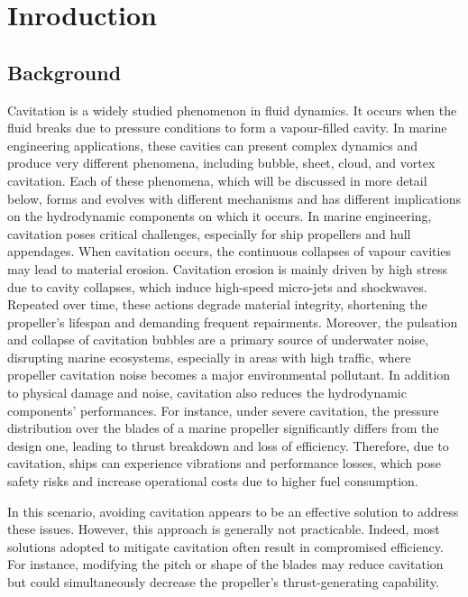 \chapter{Inroduction}
\label{chap:chapter1}

\section{Background}

Cavitation is a widely studied phenomenon in fluid dynamics. It occurs when the fluid breaks due to pressure conditions to form a vapour-filled cavity. In marine engineering applications, these cavities can present complex dynamics and produce very different phenomena, including bubble, sheet, cloud, and vortex cavitation. 
Each of these phenomena, which will be discussed in more detail below, forms and evolves with different mechanisms and has different implications on the hydrodynamic components on which it occurs.
In marine engineering, cavitation poses critical challenges, especially for ship propellers and hull appendages. When cavitation occurs, the continuous collapses of vapour cavities may lead to material erosion.
Cavitation erosion is mainly driven by high stress due to cavity collapses, which induce high-speed micro-jets and shockwaves. Repeated over time, these actions degrade material integrity, shortening the propeller's lifespan and demanding frequent repairments.
Moreover, the pulsation and collapse of cavitation bubbles are a primary source of underwater noise, disrupting marine ecosystems, especially in areas with high traffic, where propeller cavitation noise becomes a major environmental pollutant.
In addition to physical damage and noise, cavitation also reduces the hydrodynamic components' performances. For instance, under severe cavitation, the pressure distribution over the blades of a marine propeller significantly differs from the design one, leading to thrust breakdown and loss of efficiency.
Therefore, due to cavitation, ships can experience vibrations and performance losses, which pose safety risks and increase operational costs due to higher fuel consumption.

In this scenario, avoiding cavitation appears to be an effective solution to address these issues. However, this approach is generally not practicable. Indeed, most solutions adopted to mitigate cavitation often result in compromised efficiency. For instance, modifying the pitch or shape of the blades may reduce cavitation but could simultaneously decrease the propeller's thrust-generating capability.


